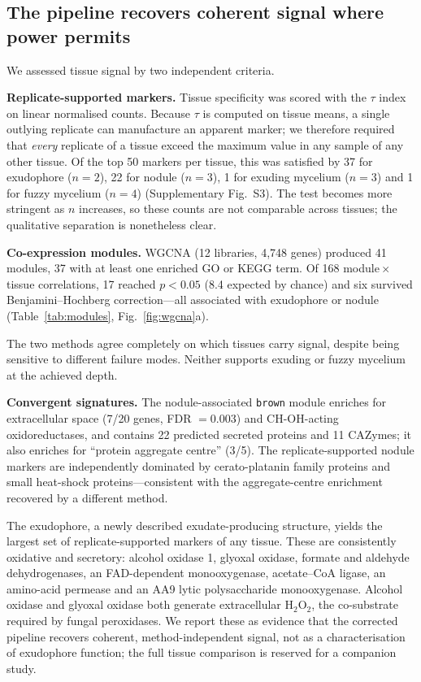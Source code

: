 \subsection{The pipeline recovers coherent signal where power permits}

We assessed tissue signal by two independent criteria.

\textbf{Replicate-supported markers.} Tissue specificity was scored with the $\tau$ index on
linear normalised counts. Because $\tau$ is computed on tissue means, a single outlying
replicate can manufacture an apparent marker; we therefore required that \emph{every}
replicate of a tissue exceed the maximum value in any sample of any other tissue. Of the top
50 markers per tissue, this was satisfied by 37 for exudophore ($n=2$), 22 for nodule ($n=3$),
1 for exuding mycelium ($n=3$) and 1 for fuzzy mycelium ($n=4$) (Supplementary Fig.~S3). The
test becomes more stringent as $n$ increases, so these counts are not comparable across
tissues; the qualitative separation is nonetheless clear.

\textbf{Co-expression modules.} WGCNA (12 libraries, 4,748 genes) produced 41 modules, 37 with
at least one enriched GO or KEGG term. Of 168 module\,$\times$\,tissue correlations, 17 reached
$p<0.05$ (8.4 expected by chance) and six survived Benjamini--Hochberg correction---all
associated with exudophore or nodule (Table~\ref{tab:modules}, Fig.~\ref{fig:wgcna}a).

The two methods agree completely on which tissues carry signal, despite being sensitive to
different failure modes. Neither supports exuding or fuzzy mycelium at the achieved depth.

\textbf{Convergent signatures.} The nodule-associated \texttt{brown} module enriches for
extracellular space (7/20 genes, FDR $=0.003$) and CH-OH-acting oxidoreductases, and contains
22 predicted secreted proteins and 11 CAZymes; it also enriches for ``protein aggregate
centre'' (3/5). The replicate-supported nodule markers are independently dominated by
cerato-platanin family proteins and small heat-shock proteins---consistent with the
aggregate-centre enrichment recovered by a different method.

The exudophore, a newly described exudate-producing structure, yields the largest set of
replicate-supported markers of any tissue. These are consistently oxidative and secretory:
alcohol oxidase 1, glyoxal oxidase, formate and aldehyde dehydrogenases, an FAD-dependent
monooxygenase, acetate--CoA ligase, an amino-acid permease and an AA9 lytic polysaccharide
monooxygenase. Alcohol oxidase and glyoxal oxidase both generate extracellular H$_2$O$_2$, the
co-substrate required by fungal peroxidases. We report these as evidence that the corrected
pipeline recovers coherent, method-independent signal, not as a characterisation of exudophore
function; the full tissue comparison is reserved for a companion study.

